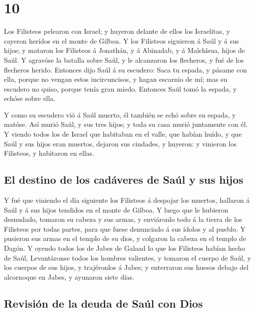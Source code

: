 \hypertarget{section-9}{%
\section{10}\label{section-9}}

 Los Filisteos pelearon con Israel; y huyeron delante de
ellos los Israelitas, y cayeron heridos en el monte de Gilboa.
 Y los Filisteos siguieron á Saúl y á sus hijos; y mataron
los Filisteos á Jonathán, y á Abinadab, y á Malchîsua, hijos de Saúl.
 Y agravóse la batalla sobre Saúl, y le alcanzaron los
flecheros, y fué de los flecheros herido.  Entonces dijo
Saúl á su escudero: Saca tu espada, y pásame con ella, porque no vengan
estos incircuncisos, y hagan escarnio de mí; mas su escudero no quiso,
porque tenía gran miedo. Entonces Saúl tomó la espada, y echóse sobre
ella.

 Y como su escudero vió á Saúl muerto, él también se echó
sobre su espada, y matóse.  Así murió Saúl, y sus tres
hijos; y toda su casa murió juntamente con él.  Y viendo
todos los de Israel que habitaban en el valle, que habían huído, y que
Saúl y sus hijos eran muertos, dejaron sus ciudades, y huyeron: y
vinieron los Filisteos, y habitaron en ellas.

\hypertarget{el-destino-de-los-caduxe1veres-de-sauxfal-y-sus-hijos}{%
\subsection{El destino de los cadáveres de Saúl y sus
hijos}\label{el-destino-de-los-caduxe1veres-de-sauxfal-y-sus-hijos}}

 Y fué que viniendo el día siguiente los Filisteos á
despojar los muertos, hallaron á Saúl y á sus hijos tendidos en el monte
de Gilboa.  Y luego que le hubieron desnudado, tomaron su
cabeza y sus armas, y enviáronlo todo á la tierra de los Filisteos por
todas partes, para que fuese denunciado á sus ídolos y al pueblo.
 Y pusieron sus armas en el templo de su dios, y colgaron
la cabeza en el templo de Dagón.  Y oyendo todos los de
Jabes de Galaad lo que los Filisteos habían hecho de Saúl, 
Levantáronse todos los hombres valientes, y tomaron el cuerpo de Saúl, y
los cuerpos de sus hijos, y trajéronlos á Jabes; y enterraron sus huesos
debajo del alcornoque en Jabes, y ayunaron siete días.

\hypertarget{revisiuxf3n-de-la-deuda-de-sauxfal-con-dios}{%
\subsection{Revisión de la deuda de Saúl con
Dios}\label{revisiuxf3n-de-la-deuda-de-sauxfal-con-dios}}

